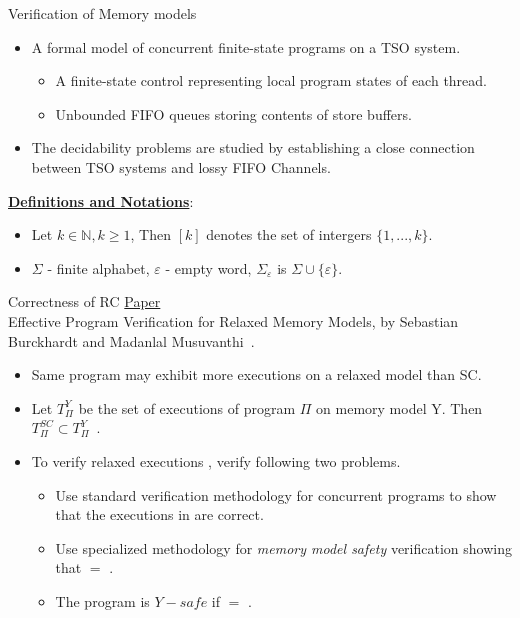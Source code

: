 \documentclass[9pt]{beamer}
\begin{document}
\begin{frame}{Verification of Memory models}
\begin{itemize}
\item A formal model of concurrent finite-state programs on a TSO system.
	\begin{itemize}
	\item A finite-state control representing local program states of each thread.
  \item Unbounded FIFO queues storing contents of store buffers.
	\end{itemize}
\pause
\item The decidability problems are studied by establishing a close connection
      between TSO systems and lossy FIFO Channels.
\end{itemize}
\end{frame}

\begin{frame}
\underline{\textbf{Definitions and Notations}}:\\
\begin{itemize}
\item Let $k \in \mathbb{N}, k \ge 1$, Then $[k]$ denotes the set of intergers
$\{1,...,k\}$.
\item $\Sigma$ - finite alphabet, $\varepsilon$ - empty word, $\Sigma_\varepsilon$ is $\Sigma \cup \{\varepsilon\}$.
\end{itemize}
\end{frame}


\begin{frame}{Correctness of RC}
\underline{Paper}\\
Effective Program Verification for Relaxed Memory Models, by Sebastian Burckhardt and
Madanlal Musuvanthi~\cite{Burckhardt2008}.
\begin{itemize}
\item Same program may exhibit more executions on
      a relaxed model than SC.
\item Let $T_{\Pi}^Y$ be the set of executions of program $\Pi$ on memory model Y.
        Then $T_{\Pi}^{SC} \subset T_{\Pi}^Y$~.
\item To verify relaxed executions \rlxset{}, verify following two problems.
  \begin{itemize}
  \item Use standard verification methodology for concurrent programs to show that
        the executions in \scset{} are correct.
  \item Use specialized methodology for {\em memory model safety} verification
        showing that \rlxset{} $=$ \scset{}.
  \item The program is $Y-safe$  if \rlxset{} $=$ \scset{}.
  \end{itemize}
\end{itemize}
\end{frame}
\end{document}
